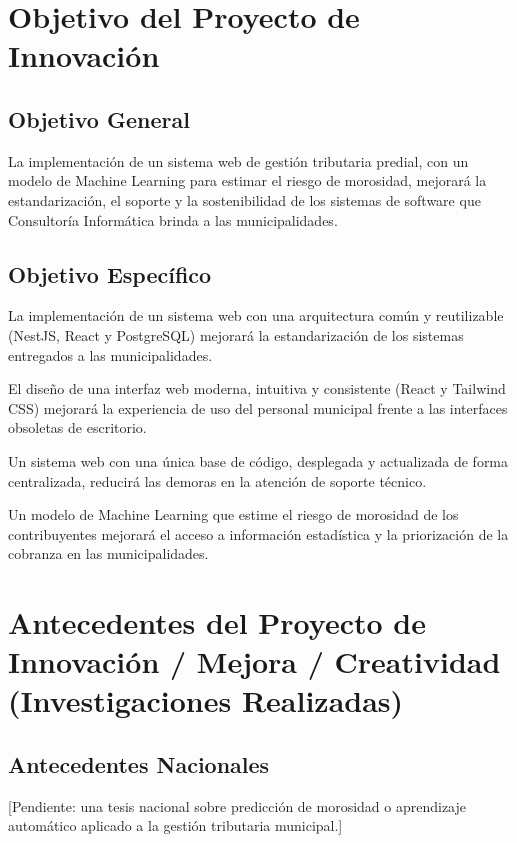 \documentclass[12pt,a4paper]{report}
\begin{document}
\section{Objetivo del Proyecto de Innovación}

\subsection{Objetivo General}

La implementación de un sistema web de gestión tributaria predial, con un modelo de Machine Learning para estimar el riesgo de morosidad, mejorará la estandarización, el soporte y la sostenibilidad de los sistemas de software que Consultoría Informática brinda a las municipalidades.

\subsection{Objetivo Específico}

\medskip
La implementación de un sistema web con una arquitectura común y reutilizable (NestJS, React y PostgreSQL) mejorará la estandarización de los sistemas entregados a las municipalidades.

\medskip
El diseño de una interfaz web moderna, intuitiva y consistente (React y Tailwind CSS) mejorará la experiencia de uso del personal municipal frente a las interfaces obsoletas de escritorio.

\medskip
Un sistema web con una única base de código, desplegada y actualizada de forma centralizada, reducirá las demoras en la atención de soporte técnico.

\medskip
Un modelo de Machine Learning que estime el riesgo de morosidad de los contribuyentes mejorará el acceso a información estadística y la priorización de la cobranza en las municipalidades.

\section{Antecedentes del Proyecto de Innovación / Mejora / Creatividad (Investigaciones Realizadas)}

\subsection*{Antecedentes Nacionales}
[Pendiente: una tesis nacional sobre predicción de morosidad o aprendizaje automático aplicado a la gestión tributaria municipal.]
\end{document}
